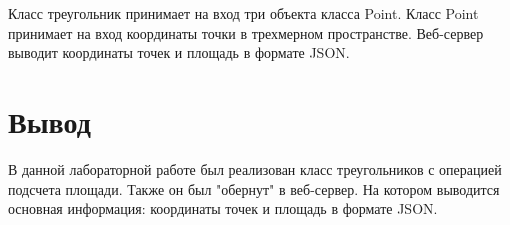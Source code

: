 \documentclass[a4paper, 14pt]{extarticle}
\begin{document}
Класс треугольник принимает на вход три объекта класса Point. Класс Point принимает на вход координаты точки в трехмерном пространстве. Веб-сервер выводит координаты точек и площадь в формате JSON.

\section{Вывод}
В данной лабораторной работе был реализован класс треугольников с операцией подсчета площади. Также он был "обернут" в веб-сервер. На котором выводится основная информация: координаты точек и площадь в формате JSON.
\end{document}
